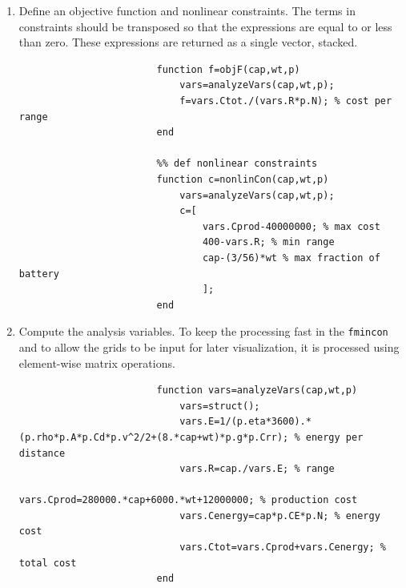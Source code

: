 \documentclass[11pt,twocolumn]{article}
\begin{document}
\begin{enumerate}
\begin{lstlisting}[firstnumber=last]
                        %% print results
                        fprintf('Design Variables:\nx1=%.3f\tx2=%.f\n\n',DV_opt);
                        fprintf('Objective Function Value:\nf=%.3f\n\n',f_opt);
                        fprintf('Analysis Variables:\n');
                        disp(analyzeVars(DV_opt(1),DV_opt(2),p));
                    \end{lstlisting}
                    \item Define an objective function and nonlinear constraints. The terms in constraints should be transposed so that the expressions are equal to or less than zero. These expressions are returned as a single vector, stacked.
                    \begin{lstlisting}[firstnumber=last]
                        %% def objective function
                        function f=objF(cap,wt,p)
                            vars=analyzeVars(cap,wt,p);
                            f=vars.Ctot./(vars.R*p.N); % cost per range
                        end

                        %% def nonlinear constraints
                        function c=nonlinCon(cap,wt,p)
                            vars=analyzeVars(cap,wt,p);
                            c=[
                                vars.Cprod-40000000; % max cost
                                400-vars.R; % min range
                                cap-(3/56)*wt % max fraction of battery
                                ];
                        end
                    \end{lstlisting}
                    \item Compute the analysis variables. To keep the processing fast in the \texttt{fmincon} and to allow the grids to be input for later visualization, it is processed using element-wise matrix operations.
                    \begin{lstlisting}[firstnumber=last]
                        %% def analysis variables
                        function vars=analyzeVars(cap,wt,p)
                            vars=struct();
                            vars.E=1/(p.eta*3600).*(p.rho*p.A*p.Cd*p.v^2/2+(8.*cap+wt)*p.g*p.Crr); % energy per distance
                            vars.R=cap./vars.E; % range
                            vars.Cprod=280000.*cap+6000.*wt+12000000; % production cost
                            vars.Cenergy=cap*p.CE*p.N; % energy cost
                            vars.Ctot=vars.Cprod+vars.Cenergy; % total cost
                        end
                    \end{lstlisting}
                \end{enumerate}
\end{document}
